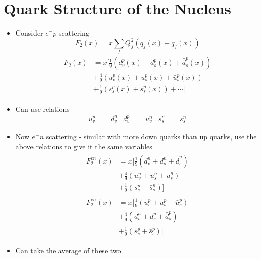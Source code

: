 \documentclass[a4paper, 11pt, normalem]{report}
\begin{document}
\section{Quark Structure of the Nucleus}
\begin{itemize}
    \item Consider $e^-p$ scattering
        \begin{equation}
            F_2(x) = x\sum_f Q_f^2(q_f(x) + \bar{q}_f(x)) 
        \end{equation}
        \begin{align}
            \begin{split}
                F_2(x) &= x\Bigg[\frac{1}{9}\left(d_v^p(x) + d_s^p(x) + \bar{d}_s^p(x)\right) \\ &+ \frac{4}{9}\left(u_v^p(x) + u_s^p(x) + \bar{u}_s^p(x)\right) \\ &+ \frac{1}{9}\left(s_s^p(x) + \bar{s}_s^p(x)\right) + \cdots \Bigg] 
        \end{split}
        \end{align}
    \item Can use relations
        \begin{align}
            u_v^p &= d_v^n & d_v^p &= u_v^n & s_s^p &= s_s^n 
        \end{align}
    \item Now $e^-n$ scattering - similar with more down quarks than up quarks, use the above relations to give it the same variables
        \begin{align}
            \begin{split}
                F_2^{en}(x) &= x\bigg[\frac19\left(d_v^n + d_s^n + \bar{d}_s^n\right) \\ &+ \frac49\left(u_v^n + u_s^n + \bar{u}_s^n\right) \\ &+ \frac19\left(s_s^n + \bar{s}_s^n\right)\bigg]
            \end{split}\\
            \begin{split}
                F_2^{en}(x) &= x\bigg[\frac19\left(u_v^p + u_s^p + \bar{u}_s^p\right) \\ &+ \frac49\left(d_v^n + d_s^p + \bar{d}_s^p\right) \\ &+ \frac19\left(s_s^p + \bar{s}_s^p\right)\bigg]
            \end{split}
        \end{align}
    \item Can take the average of these two 
        \begin{align}

\end{align}
\end{itemize}
\end{document}

